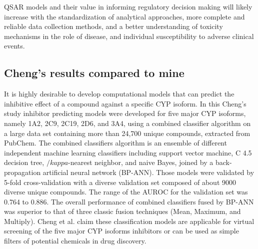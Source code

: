 

QSAR models and their value in informing regulatory decision making will likely increase with the standardization of analytical approaches, more complete and reliable data collection methods, and a better understanding of toxicity mechanisms in the role of disease, and individual susceptibility to adverse clinical events.\cite{Kruhlak2012}

\subsection{Cheng's results compared to mine}
It is highly desirable to develop computational models that can predict the inhibitive effect of a compound against a specific CYP isoform. In this Cheng's study inhibitor predicting models were developed for five major CYP isoforms, namely 1A2, 2C9, 2C19, 2D6, and 3A4, using a combined classifier algorithm on a large data set containing more than 24,700 unique compounds, extracted from PubChem. The combined classifiers algorithm is an ensemble of different independent machine learning classifiers including support vector machine, C 4.5 decision tree, $/kappa$-nearest neighbor, and naive Bayes, joined by a back-propagation artificial neural network (BP-ANN). Those models were validated by 5-fold cross-validation with a diverse validation set composed of about 9000 diverse unique compounds. The range of the AUROC for the validation set was 0.764 to 0.886. The overall performance of combined classifiers fused by BP-ANN was superior to that of three classic fusion techniques (Mean, Maximum, and Multiply). Cheng et al. claim these classification models are applicable for virtual screening of the five major CYP isoforms inhibitors or can be used as simple filters of potential chemicals in drug discovery.\cite{Cheng2011}

